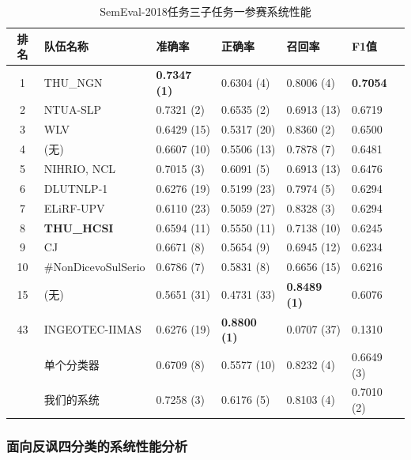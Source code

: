 \begin{table}[htb]
  \centering
  \begin{minipage}[t]{\linewidth}
  \caption{SemEval-2018任务三子任务一参赛系统性能} %
  \label{tab:exp_irony_det_A_other_comp}
    \begin{tabularx}{\linewidth}{c|X|llll}
    \toprule[1.5pt]
    排名 & 队伍名称 & 准确率 & 正确率 & 召回率 & F1值 \\
    \hline 
    1 & THU\_NGN & \bf 0.7347 (1) & 0.6304 (4) & 0.8006 (4) & \bf 0.7054 \\
    2 & NTUA-SLP & 0.7321 (2) & 0.6535 (2) & 0.6913 (13) & 0.6719 \\
    3 & WLV & 0.6429 (15) & 0.5317 (20) & 0.8360 (2) & 0.6500 \\
    4 & (无) & 0.6607 (10) & 0.5506 (13) & 0.7878 (7) & 0.6481 \\
    5 & NIHRIO, NCL & 0.7015 (3) & 0.6091 (5) & 0.6913 (13) & 0.6476 \\
    6 & DLUTNLP-1 & 0.6276 (19) & 0.5199 (23) & 0.7974 (5) & 0.6294 \\
    7 & ELiRF-UPV & 0.6110 (23) & 0.5059 (27) & 0.8328 (3) & 0.6294 \\
    8 & \bf THU\_HCSI & 0.6594 (11) & 0.5550 (11) & 0.7138 (10) & 0.6245 \\
    9 & CJ & 0.6671 (8) & 0.5654 (9) & 0.6945 (12) & 0.6234 \\ 
    10 & \#NonDicevoSulSerio & 0.6786 (7) & 0.5831 (8) & 0.6656 (15) & 0.6216 \\
    \hline
    15 & (无) & 0.5651 (31) & 0.4731 (33) & \bf 0.8489 (1) & 0.6076 \\
    \hline
    43 & INGEOTEC-IIMAS & 0.6276 (19) & \bf 0.8800 (1) & 0.0707 (37) & 0.1310 \\
    \hline 
    & 单个分类器 & 0.6709 (8) & 0.5577 (10) & 0.8232 (4) & 0.6649 (3) \\ %
    & 我们的系统 & 0.7258 (3) & 0.6176 (5) & 0.8103 (4) & 0.7010 (2) \\
    \bottomrule[1.5pt]
    \end{tabularx}
  \end{minipage}
\end{table}

\subsubsection{面向反讽四分类的系统性能分析}

